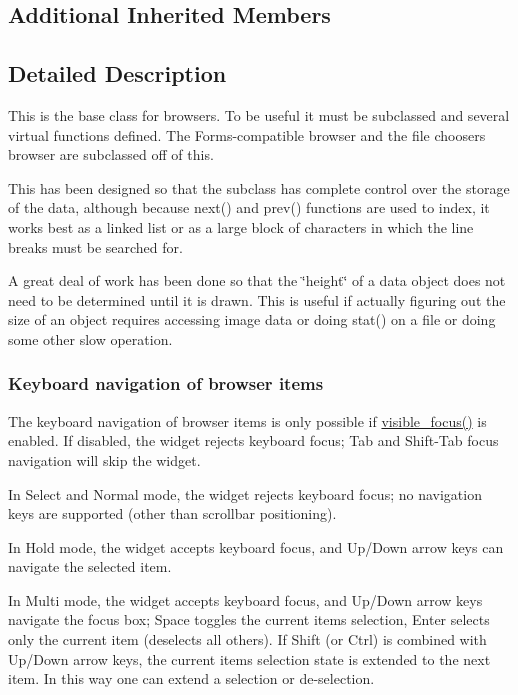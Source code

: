 \subsection*{Additional Inherited Members}


\subsection{Detailed Description}
This is the base class for browsers. To be useful it must be subclassed and several virtual functions defined. The Forms-\/compatible browser and the file chooser\textquotesingle{}s browser are subclassed off of this.

This has been designed so that the subclass has complete control over the storage of the data, although because next() and prev() functions are used to index, it works best as a linked list or as a large block of characters in which the line breaks must be searched for.

A great deal of work has been done so that the \char`\"{}height\char`\"{} of a data object does not need to be determined until it is drawn. This is useful if actually figuring out the size of an object requires accessing image data or doing stat() on a file or doing some other slow operation.

\subsubsection*{Keyboard navigation of browser items }

The keyboard navigation of browser items is only possible if \hyperlink{class_fl___widget_a1acaad8af2c94836dea0d3086dca1ac3}{visible\+\_\+focus()} is enabled. If disabled, the widget rejects keyboard focus; Tab and Shift-\/\+Tab focus navigation will skip the widget.

In \textquotesingle{}Select\textquotesingle{} and \textquotesingle{}Normal\textquotesingle{} mode, the widget rejects keyboard focus; no navigation keys are supported (other than scrollbar positioning).

In \textquotesingle{}Hold\textquotesingle{} mode, the widget accepts keyboard focus, and Up/\+Down arrow keys can navigate the selected item.

In \textquotesingle{}Multi\textquotesingle{} mode, the widget accepts keyboard focus, and Up/\+Down arrow keys navigate the focus box; Space toggles the current item\textquotesingle{}s selection, Enter selects only the current item (deselects all others). If Shift (or Ctrl) is combined with Up/\+Down arrow keys, the current item\textquotesingle{}s selection state is extended to the next item. In this way one can extend a selection or de-\/selection. 

